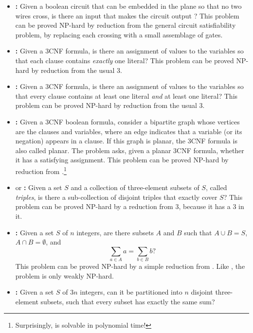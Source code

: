 \begin{itemize}
\item \textbf{:} Given a boolean circuit that can be embedded in the plane so that no two wires cross, is there an input that makes the circuit output ?
This problem can be proved NP-hard by reduction from the general circuit satisfiability problem, by replacing each crossing with a small assemblage of gates.
\item \textbf{:} Given a 3CNF formula, is there an assignment of values to the variables so that each clause contains \textit{exactly} one  literal?
This problem can be proved NP-hard by reduction from the usual 3.
\item \textbf{:} Given a 3CNF formula, is there an assignment of values to the variables so that every clause contains at least one  literal \textit{and} at least one  literal?
This problem can be proved NP-hard by reduction from the usual 3.
\item \textbf{:} Given a 3CNF boolean formula, consider a bipartite graph whose vertices are the clauses and variables, where an edge indicates that a variable (or its negation) appears in a clause.
If this graph is planar, the 3CNF formula is also called planar.
The  problem asks, given a planar 3CNF formula, whether it has a satisfying assignment.
This problem can be proved NP-hard by reduction from .\footnote{Surprisingly,  is solvable in polynomial time!}
\item \textbf{} or \textbf{:} Given a set $S$ and a collection of three-element subsets of $S$, called \textit{triples}, is there a sub-collection of disjoint triples that exactly cover $S$?
This problem can be proved NP-hard by a reduction from 3, because it has a 3 in it.
\item \textbf{:} Given a set $S$ of $n$ integers, are there subsets $A$ and $B$ such that $A \cup B = S$, $A \cap B = \emptyset$, and
\[
\sum_{a \in A} a = \sum_{b \in B} b?
\]
This problem can be proved NP-hard by a simple reduction from .
Like , the  problem is only weakly NP-hard.
\item \textbf{:} Given a set $S$ of $3n$ integers, can it be partitioned into $n$ disjoint three-element subsets, such that every subset has exactly the same sum?

\end{itemize}
